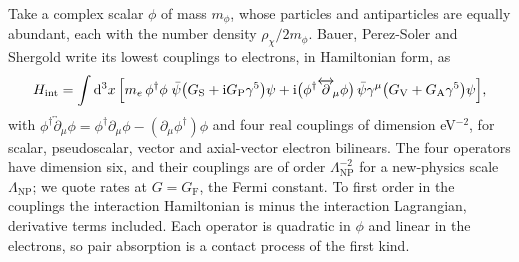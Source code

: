 Take a complex scalar $\phi$ of mass $m_\phi$, whose particles and antiparticles are equally abundant, each with the number density $\rho_\chi/2m_\phi$. Bauer, Perez-Soler and Shergold write its lowest couplings to electrons, in Hamiltonian form, as~\cite[Eq.~(3)]{bauer2026dark}
\begin{equation}
  H_{\mathrm{int}} = \int\mathrm{d}^3x\,\Bigl[m_e\,\phi^\dagger\phi\;\bar\psi\bigl(G_{\mathrm{S}} + \mathrm{i} G_{\mathrm{P}}\gamma^5\bigr)\psi
  + \mathrm{i}\bigl(\phi^\dagger\overleftrightarrow{\partial}_{\!\mu}\phi\bigr)\,\bar\psi\gamma^\mu\bigl(G_{\mathrm{V}} + G_{\mathrm{A}}\gamma^5\bigr)\psi\Bigr] ,
  \label{eq:10.8-Hpair}
\end{equation}
with $\phi^\dagger\overleftrightarrow{\partial}_{\!\mu}\phi = \phi^\dagger\partial_\mu\phi - (\partial_\mu\phi^\dagger)\phi$ and four real couplings of dimension eV$^{-2}$, for scalar, pseudoscalar, vector and axial-vector electron bilinears. The four operators have dimension six, and their couplings are of order $\Lambda_{\mathrm{NP}}^{-2}$ for a new-physics scale $\Lambda_{\mathrm{NP}}$; we quote rates at $G = G_{\mathrm{F}}$, the Fermi constant. To first order in the couplings the interaction Hamiltonian is minus the interaction Lagrangian, derivative terms included. Each operator is quadratic in $\phi$ and linear in the electrons, so pair absorption is a contact process of the first kind.

